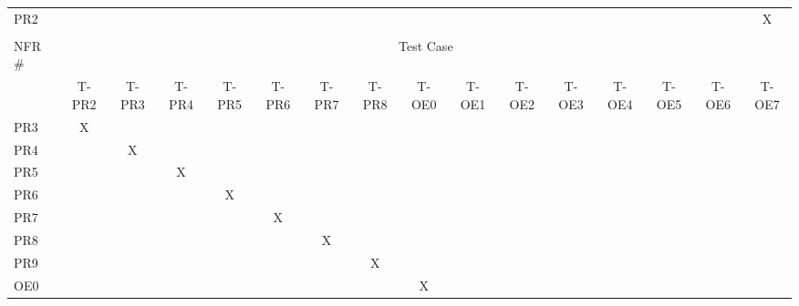 \documentclass[12pt, titlepage]{article}
\begin{document}
\begin{longtable}{lcccclllllclcccc}
\multicolumn{1}{l|}{PR2} & \multicolumn{1}{l}{} & \multicolumn{1}{l}{} & \multicolumn{1}{l}{} & \multicolumn{1}{l}{} &  &  &  &  &  & \multicolumn{1}{l}{} &  & \multicolumn{1}{l}{} & \multicolumn{1}{l}{} & \multicolumn{1}{l}{} & X \\
 & \multicolumn{1}{l}{} & \multicolumn{1}{l}{} & \multicolumn{1}{l}{} & \multicolumn{1}{l}{} &  &  &  &  &  & \multicolumn{1}{l}{} &  & \multicolumn{1}{l}{} & \multicolumn{1}{l}{} & \multicolumn{1}{l}{} & \multicolumn{1}{l}{} \\
\multicolumn{1}{l|}{NFR \#} & \multicolumn{15}{c}{Test Case} \\ \hline
\multicolumn{1}{l|}{} & T-PR2 & T-PR3 & T-PR4 & T-PR5 & \multicolumn{1}{c}{T-PR6} & \multicolumn{1}{c}{T-PR7} & \multicolumn{1}{c}{T-PR8} & \multicolumn{1}{c}{T-OE0} & \multicolumn{1}{c}{T-OE1} & T-OE2 & \multicolumn{1}{c}{T-OE3} & T-OE4 & T-OE5 & T-OE6 & T-OE7 \\
\multicolumn{1}{l|}{PR3} & X &  &  &  &  &  &  &  &  & \multicolumn{1}{l}{} &  & \multicolumn{1}{l}{} & \multicolumn{1}{l}{} & \multicolumn{1}{l}{} & \multicolumn{1}{l}{} \\
\multicolumn{1}{l|}{PR4} &  & X &  &  &  &  &  &  &  & \multicolumn{1}{l}{} &  & \multicolumn{1}{l}{} & \multicolumn{1}{l}{} & \multicolumn{1}{l}{} & \multicolumn{1}{l}{} \\
\multicolumn{1}{l|}{PR5} &  &  & X &  &  &  &  &  &  & \multicolumn{1}{l}{} &  & \multicolumn{1}{l}{} & \multicolumn{1}{l}{} & \multicolumn{1}{l}{} & \multicolumn{1}{l}{} \\
\multicolumn{1}{l|}{PR6} &  &  &  & X &  &  &  &  &  & \multicolumn{1}{l}{} &  & \multicolumn{1}{l}{} & \multicolumn{1}{l}{} & \multicolumn{1}{l}{} & \multicolumn{1}{l}{} \\
\multicolumn{1}{l|}{PR7} &  &  &  &  & \multicolumn{1}{c}{X} &  &  &  &  & \multicolumn{1}{l}{} &  & \multicolumn{1}{l}{} & \multicolumn{1}{l}{} & \multicolumn{1}{l}{} & \multicolumn{1}{l}{} \\
\multicolumn{1}{l|}{PR8} &  &  &  &  & \multicolumn{1}{c}{} & \multicolumn{1}{c}{X} &  &  &  & \multicolumn{1}{l}{} &  & \multicolumn{1}{l}{} & \multicolumn{1}{l}{} & \multicolumn{1}{l}{} & \multicolumn{1}{l}{} \\
\multicolumn{1}{l|}{PR9} &  &  &  &  &  & \multicolumn{1}{c}{} & \multicolumn{1}{c}{X} &  &  & \multicolumn{1}{l}{} &  & \multicolumn{1}{l}{} & \multicolumn{1}{l}{} & \multicolumn{1}{l}{} & \multicolumn{1}{l}{} \\
\multicolumn{1}{l|}{OE0} &  &  &  &  &  &  &  & \multicolumn{1}{c}{X} &  & \multicolumn{1}{l}{} &  & \multicolumn{1}{l}{} & \multicolumn{1}{l}{} & \multicolumn{1}{l}{} & \multicolumn{1}{l}{} \\

\end{longtable}
\end{document}
